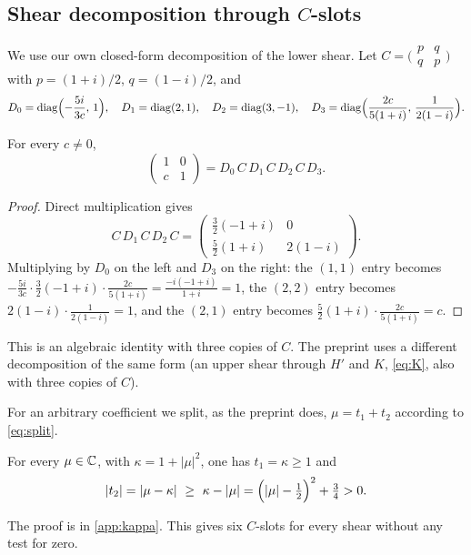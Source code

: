 \documentclass[11pt]{article}
\theoremstyle{plain}
\DeclareMathOperator{\diag}{diag}
\newcommand{\abs}[1]{\lvert #1\rvert}
\begin{document}
\subsection{Shear decomposition through \texorpdfstring{$C$}{C}-slots}\label{sec:cslots}
We use our own closed-form decomposition of the lower shear. Let $C=\bigl(\begin{smallmatrix}p&q\\q&p\end{smallmatrix}\bigr)$ with $p=(1+i)/2$, $q=(1-i)/2$, and
\begin{equation}\label{eq:D}
D_0=\diag\Bigl(-\frac{5i}{3c},\,1\Bigr),\quad D_1=\diag(2,1),\quad D_2=\diag(3,-1),\quad D_3=\diag\Bigl(\frac{2c}{5(1+i)},\,\frac{1}{2(1-i)}\Bigr).
\end{equation}
\begin{lemma}\label{lem:shear}
For every $c\ne0$,
\begin{equation}\label{eq:shear}
\begin{pmatrix}1&0\\c&1\end{pmatrix}=D_0\,C\,D_1\,C\,D_2\,C\,D_3 .
\end{equation}
\end{lemma}
\begin{proof}
Direct multiplication gives
\begin{equation}\label{eq:CDCDC}
C\,D_1\,C\,D_2\,C=\begin{pmatrix}\frac32(-1+i)&0\\[2pt]\frac52(1+i)&2(1-i)\end{pmatrix}.
\end{equation}
Multiplying by $D_0$ on the left and $D_3$ on the right: the $(1,1)$ entry becomes $-\frac{5i}{3c}\cdot\frac32(-1+i)\cdot\frac{2c}{5(1+i)}=\frac{-i(-1+i)}{1+i}=1$, the $(2,2)$ entry becomes $2(1-i)\cdot\frac{1}{2(1-i)}=1$, and the $(2,1)$ entry becomes $\frac52(1+i)\cdot\frac{2c}{5(1+i)}=c$.
\end{proof}
This is an algebraic identity with three copies of $C$. The preprint uses a different decomposition of the same form (an upper shear through $H'$ and $K$, \eqref{eq:K}, also with three copies of $C$).

For an arbitrary coefficient we split, as the preprint does, $\mu=t_1+t_2$ according to \eqref{eq:split}.
\begin{lemma}\label{lem:split}
For every $\mu\in\mathbb{C}$, with $\kappa=1+\abs{\mu}^2$, one has $t_1=\kappa\ge1$ and
\begin{equation}\label{eq:kappa}
\abs{t_2}=\abs{\mu-\kappa}\ \ge\ \kappa-\abs{\mu}=\Bigl(\abs{\mu}-\tfrac12\Bigr)^2+\tfrac34>0 .
\end{equation}
\end{lemma}
The proof is in \cref{app:kappa}. This gives six $C$-slots for every shear without any test for zero.
\end{document}
